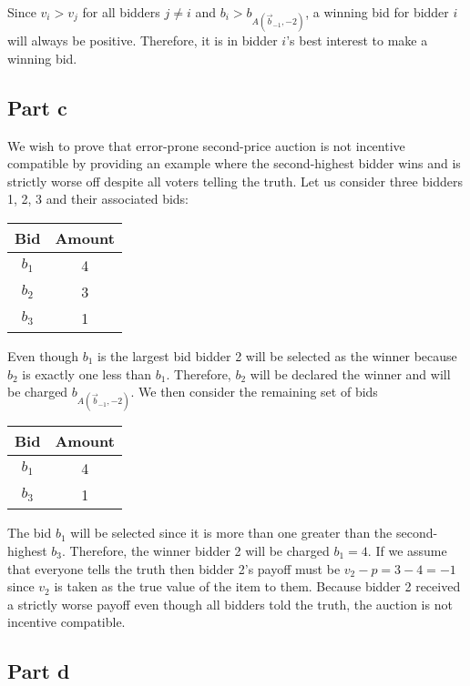 \documentclass[12pt]{article}%
\begin{document}
Since $v_i > v_j$ for all bidders $j \neq i$ and $b_i > b_{A(\vec{b}_{-1}, -2)}$, a winning bid for bidder $i$ will always be positive. Therefore, it is in bidder $i$'s best interest to make a winning bid.

\subsection*{Part c}

We wish to prove that error-prone second-price auction is not incentive compatible by providing an example where the second-highest bidder wins and is strictly worse off despite all voters telling the truth. Let us consider three bidders 1, 2, 3 and their associated bids:

\begin{center}
\begin{tabular}{|c|c|}
\hline
Bid   & Amount \\ \hline
$b_1$ & 4      \\ \hline
$b_2$ & 3      \\ \hline
$b_3$ & 1      \\ \hline
\end{tabular}
\end{center}

Even though $b_1$ is the largest bid bidder 2 will be selected as the winner because $b_2$ is exactly one less than $b_1$. Therefore, $b_2$ will be declared the winner and will be charged $b_{A(\vec{b}_{-1}, -2)}$. We then consider the remaining set of bids

\begin{center}
\begin{tabular}{|c|c|}
\hline
Bid   & Amount \\ \hline
$b_1$ & 4      \\ \hline
$b_3$ & 1      \\ \hline
\end{tabular}
\end{center}

The bid $b_1$ will be selected since it is more than one greater than the second-highest $b_3$. Therefore, the winner bidder 2 will be charged $b_1 = 4$. If we assume that everyone tells the truth then bidder 2's payoff must be $v_2 - p = 3 - 4 = -1$ since $v_2$ is taken as the true value of the item to them. Because bidder 2 received a strictly worse payoff even though all bidders told the truth, the auction is not incentive compatible.

\subsection*{Part d}
\end{document}
